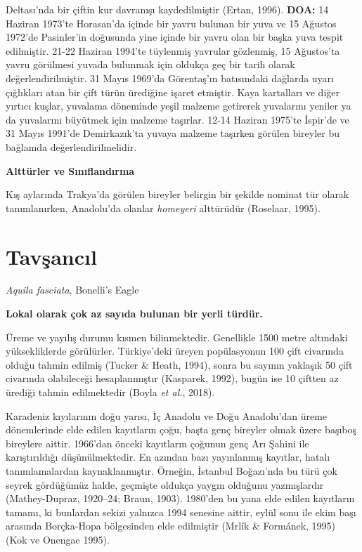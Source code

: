 \documentclass[
  a4paper,
  DIV=11,
  numbers=noendperiod]{scrreprt}
\begin{document}
Deltası'nda bir çiftin kur davranışı kaydedilmiştir (Ertan, 1996).
\textbf{DOA:} 14 Haziran 1973'te Horasan'da içinde bir yavru bulunan bir
yuva ve 15 Ağustos 1972'de Pasinler'in doğusunda yine içinde bir yavru
olan bir başka yuva tespit edilmiştir. 21-22 Haziran 1994'te tüylenmiş
yavrular gözlenmiş, 15 Ağustos'ta yavru görülmesi yuvada bulunmak için
oldukça geç bir tarih olarak değerlendirilmiştir. 31 Mayıs 1969'da
Görentaş'ın batısındaki dağlarda uyarı çığlıkları atan bir çift türün
ürediğine işaret etmiştir. Kaya kartalları ve diğer yırtıcı kuşlar,
yuvalama döneminde yeşil malzeme getirerek yuvalarını yeniler ya da
yuvalarını büyütmek için malzeme taşırlar. 12-14 Haziran 1975'te
İspir'de ve 31 Mayıs 1991'de Demirkazık'ta yuvaya malzeme taşırken
görülen bireyler bu bağlamda değerlendirilmelidir.

\textbf{Alttürler ve Sınıflandırma}

Kış aylarında Trakya'da görülen bireyler belirgin bir şekilde nominat
tür olarak tanımlanırken, Anadolu'da olanlar \emph{homeyeri} alttürüdür
(Roselaar, 1995).

\section{Tavşancıl}\label{tavux15fancux131l}

\emph{Aquila fasciata}, Bonelli's Eagle

\textbf{Lokal olarak çok az sayıda bulunan bir yerli türdür.}

Üreme ve yayılış durumu kısmen bilinmektedir. Genellikle 1500 metre
altındaki yüksekliklerde görülürler. Türkiye'deki üreyen popülasyonun
100 çift civarında olduğu tahmin edilmiş (Tucker \& Heath, 1994), sonra
bu sayının yaklaşık 50 çift civarında olabileceği hesaplanmıştır
(Kasparek, 1992), bugün ise 10 çiftten az ürediği tahmin edilmektedir
(Boyla \emph{et al.}, 2018).

Karadeniz kıyılarının doğu yarısı, İç Anadolu ve Doğu Anadolu'dan üreme
dönemlerinde elde edilen kayıtların çoğu, başta genç bireyler olmak
üzere başıboş bireylere aittir. 1966'dan önceki kayıtların çoğunun genç
Arı Şahini ile karıştırıldığı düşünülmektedir. En azından bazı
yayınlanmış kayıtlar, hatalı tanımlamalardan kaynaklanmıştır. Örneğin,
İstanbul Boğazı'nda bu türü çok seyrek gördüğümüz halde, geçmişte
oldukça yaygın olduğunu yazmışlardır (Mathey-Dupraz, 1920--24; Braun,
1903). 1980'den bu yana elde edilen kayıtların tamamı, ki bunlardan
sekizi yalnızca 1994 senesine aittir, eylül sonu ile ekim başı arasında
Borçka-Hopa bölgesinden elde edilmiştir (Mrlík \& Formánek, 1995) (Kok
ve Onengae 1995).
\end{document}
